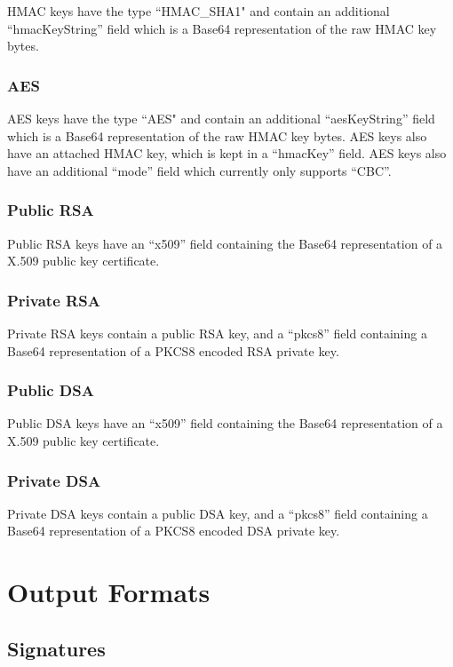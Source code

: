 \documentclass{llncs}
\begin{document}
HMAC keys have the type ``HMAC\_SHA1" and contain an additional
``hmacKeyString'' field which is a Base64 representation of the raw HMAC key
bytes. 

\subsubsection{AES}

AES keys have the type ``AES" and contain an additional
``aesKeyString'' field which is a Base64 representation of the raw HMAC key bytes. AES keys also have an attached HMAC
key, which is kept in a ``hmacKey'' field. AES keys also have an additional
``mode'' field which currently only supports ``CBC''.

\subsubsection{Public RSA}

Public RSA keys have an ``x509'' field containing the Base64 representation of
a X.509 public key certificate. 

\subsubsection{Private RSA}

Private RSA keys contain a public RSA key, and a ``pkcs8'' field containing a
Base64 representation of a PKCS8 encoded RSA private key. 

\subsubsection{Public DSA}

Public DSA keys have an ``x509'' field containing the Base64 representation of
a X.509 public key certificate. 

\subsubsection{Private DSA}

Private DSA keys contain a public DSA key, and a ``pkcs8'' field containing a
Base64 representation of a PKCS8 encoded DSA private key. 

\section{Output Formats}

\subsection{Signatures}\label{signatures}
\end{document}
